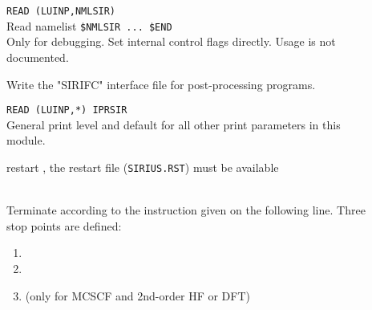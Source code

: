 \begin{description}

\item[]
  \verb"READ (LUINP,NMLSIR)" \\
  Read namelist \verb"$NMLSIR ... $END" \\
  Only for debugging. Set internal control flags directly.
  Usage is not documented.

\item[]
  Write the "SIRIFC" interface file for post-processing programs.


\item[]
  \verb"READ (LUINP,*) IPRSIR" \\
  General {\sir} print level and default for all other print parameters in this module.

\item[]
  restart {\sir},
  the {\sir} restart file (\verb|SIRIUS.RST|) must be available


\item[]
   \\
  Terminate {\sir} according to the instruction given on the following line.
  Three stop points are defined:
\begin{enumerate}

\item \hspace{2em} 

\item \hspace{2em} 

\item \hspace{2em}  (only for MCSCF and 2nd-order HF or DFT)
\end{enumerate}


\end{description}
